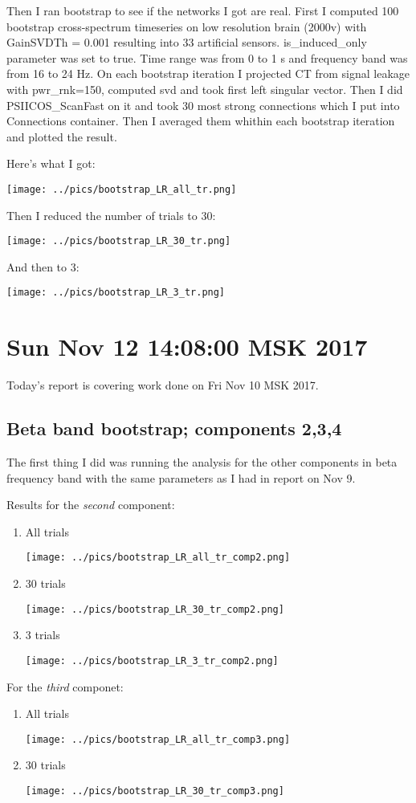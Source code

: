 \documentclass{article}
\begin{document}
Then I ran bootstrap to see if the networks I got are real. First I computed 100 bootstrap
cross-spectrum timeseries on low resolution brain (2000v) with GainSVDTh = 0.001 resulting
into 33 artificial sensors.
is\_induced\_only parameter was set to true.
Time range was from 0 to 1 s and frequency band was from 16 to 24 Hz.
On each bootstrap iteration I projected CT from signal leakage with pwr\_rnk=150,
computed svd and took first left singular vector. Then I did PSIICOS\_ScanFast on it and
took 30 most strong connections which I put into Connections container.
Then I averaged them whithin each bootstrap iteration and plotted the result.

Here's what I got:

\texttt{[image: ../pics/bootstrap\_LR\_all\_tr.png]}

Then I reduced the number of trials to 30:

\texttt{[image: ../pics/bootstrap\_LR\_30\_tr.png]}

And then to 3:

\texttt{[image: ../pics/bootstrap\_LR\_3\_tr.png]}

\section{Sun Nov 12 14:08:00 MSK 2017}
Today's report is covering work done on Fri Nov 10 MSK 2017.

\subsection{Beta band bootstrap; components 2,3,4}
The  first thing I did was running the analysis for the other components in
beta frequency band with the same parameters as I had in report on Nov 9.

Results for the \emph{second} component:
\begin{enumerate}
\item All trials

\texttt{[image: ../pics/bootstrap\_LR\_all\_tr\_comp2.png]}

\item 30 trials

\texttt{[image: ../pics/bootstrap\_LR\_30\_tr\_comp2.png]}

\item 3 trials

\texttt{[image: ../pics/bootstrap\_LR\_3\_tr\_comp2.png]}
\end{enumerate}
For the \emph{third} componet:
\begin{enumerate}
\item All trials

\texttt{[image: ../pics/bootstrap\_LR\_all\_tr\_comp3.png]}

\item 30 trials

\texttt{[image: ../pics/bootstrap\_LR\_30\_tr\_comp3.png]}
\end{enumerate}
\end{document}
